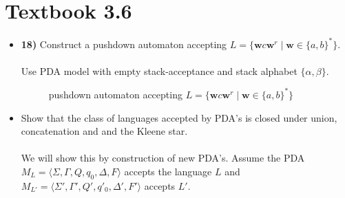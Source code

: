\documentclass[defaultpackages]{simplereport}
\begin{document}
\section*{Textbook 3.6}
\begin{itemize}[label=]
  \item \textbf{18)} Construct a pushdown automaton accepting $L =
    \{\textbf{w}c\textbf{w}^r \mid \textbf{w} \in \{a, b\}^*\}$.\\\\
    Use PDA model with empty stack-acceptance and stack alphabet $\{\alpha, \beta\}$.
    \begin{figure}[H]
     \centering
     \caption{pushdown automaton accepting $L = \{\textbf{w}c\textbf{w}^r \mid \textbf{w} \in \{a, b\}^*\}$}
   \end{figure}
   
   \item Show that the class of languages accepted by PDA's is closed under
     union, concatenation and and the Kleene star.\\\\
     We will show this by construction of new PDA's. Assume the PDA $M_L =
     \langle \Sigma, \Gamma, Q, q_0, \Delta, F \rangle$ accepts the language $L$
     and $M_{L'} = \langle \Sigma', \Gamma', Q', q'_0, \Delta', F' \rangle$
     accepts $L'$.\\


\end{itemize}
\end{document}
